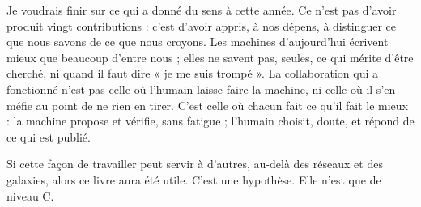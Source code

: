Je voudrais finir sur ce qui a donné du sens à cette année. Ce n'est pas d'avoir produit vingt contributions : c'est
d'avoir appris, à nos dépens, à distinguer ce que nous savons de ce que nous croyons. Les machines d'aujourd'hui
écrivent mieux que beaucoup d'entre nous ; elles ne savent pas, seules, ce qui mérite d'être cherché, ni quand il
faut dire « je me suis trompé ». La collaboration qui a fonctionné n'est pas celle où l'humain laisse faire la
machine, ni celle où il s'en méfie au point de ne rien en tirer. C'est celle où chacun fait ce qu'il fait le mieux :
la machine propose et vérifie, sans fatigue ; l'humain choisit, doute, et répond de ce qui est publié.

Si cette façon de travailler peut servir à d'autres, au-delà des réseaux et des galaxies, alors ce livre aura été
utile. C'est une hypothèse. Elle n'est que de niveau C.
